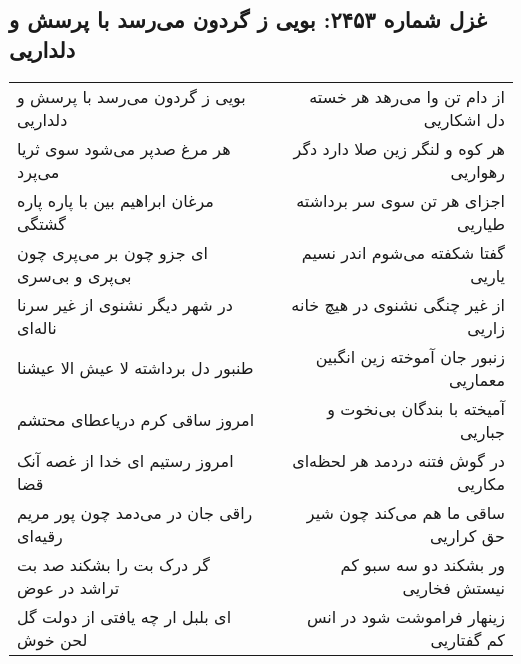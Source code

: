 \begin{center}
\section*{غزل شماره ۲۴۵۳: بویی ز گردون می‌رسد با پرسش و دلداریی}
\label{sec:2453}
\begin{longtable}{l p{0.5cm} r}
بویی ز گردون می‌رسد با پرسش و دلداریی
&&
از دام تن وا می‌رهد هر خسته دل اشکاریی
\\
هر مرغ صدپر می‌شود سوی ثریا می‌پرد
&&
هر کوه و لنگر زین صلا دارد دگر رهواریی
\\
مرغان ابراهیم بین با پاره پاره گشتگی
&&
اجزای هر تن سوی سر برداشته طیاریی
\\
ای جزو چون بر می‌پری چون بی‌پری و بی‌سری
&&
گفتا شکفته می‌شوم اندر نسیم یاریی
\\
در شهر دیگر نشنوی از غیر سرنا ناله‌ای
&&
از غیر چنگی نشنوی در هیچ خانه زاریی
\\
طنبور دل برداشته لا عیش الا عیشنا
&&
زنبور جان آموخته زین انگبین معماریی
\\
امروز ساقی کرم دریاعطای محتشم
&&
آمیخته با بندگان بی‌نخوت و جباریی
\\
امروز رستیم ای خدا از غصه آنک قضا
&&
در گوش فتنه دردمد هر لحظه‌ای مکاریی
\\
راقی جان در می‌دمد چون پور مریم رقیه‌ای
&&
ساقی ما هم می‌کند چون شیر حق کراریی
\\
گر درک بت را بشکند صد بت تراشد در عوض
&&
ور بشکند دو سه سبو کم نیستش فخاریی
\\
ای بلبل ار چه یافتی از دولت گل لحن خوش
&&
زینهار فراموشت شود در انس کم گفتاریی
\\
\end{longtable}
\end{center}
